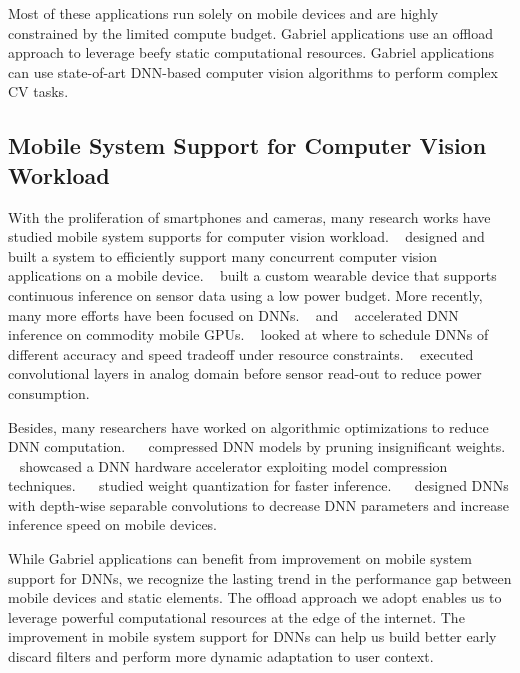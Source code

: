 Most of these applications run solely on mobile devices and are highly
constrained by the limited compute budget. Gabriel applications use an offload
approach to leverage beefy static computational resources. Gabriel applications
can use state-of-art DNN-based computer vision algorithms to perform
complex CV tasks.

\subsection{Mobile System Support for Computer Vision Workload}
With the proliferation of smartphones and cameras, many research works have
studied mobile system supports for computer vision workload.
~\cite{likamwa2015starfish} designed and built a system to efficiently support
many concurrent computer vision applications on a mobile device.
~\cite{lane2015zoe} built a custom wearable device that supports continuous
inference on sensor data using a low power budget. More recently, many more
efforts have been focused on DNNs. ~\cite{yao2017deepsense} and
~\cite{huynh2017deepmon} accelerated DNN inference on commodity mobile GPUs.
~\cite{han2016mcdnn} looked at where to schedule DNNs of different
accuracy and speed tradeoff under resource constraints.
~\cite{likamwa2016redeye} executed convolutional layers in analog domain before
sensor read-out to reduce power consumption.

Besides, many researchers have worked on algorithmic optimizations to reduce
DNN computation. ~\cite{han2015deep}~\cite{iandola2016squeezenet} compressed DNN
models by pruning insignificant weights. ~\cite{han2016eie} showcased a DNN
hardware accelerator exploiting model compression techniques.
~\cite{wu2016quantized}~\cite{gong2014compressing} studied weight quantization
for faster inference. ~\cite{howard2017mobilenets}~\cite{sandler2018inverted} designed DNNs with
depth-wise separable convolutions to decrease DNN parameters and increase
inference speed on mobile devices.

While Gabriel applications can benefit from improvement on mobile system support
for DNNs, we recognize the lasting trend in the performance gap between mobile
devices and static elements. The offload approach we adopt enables us to
leverage powerful computational resources at the edge of the internet. The
improvement in mobile system support for DNNs can help us build better early
discard filters and perform more dynamic adaptation to user context.
